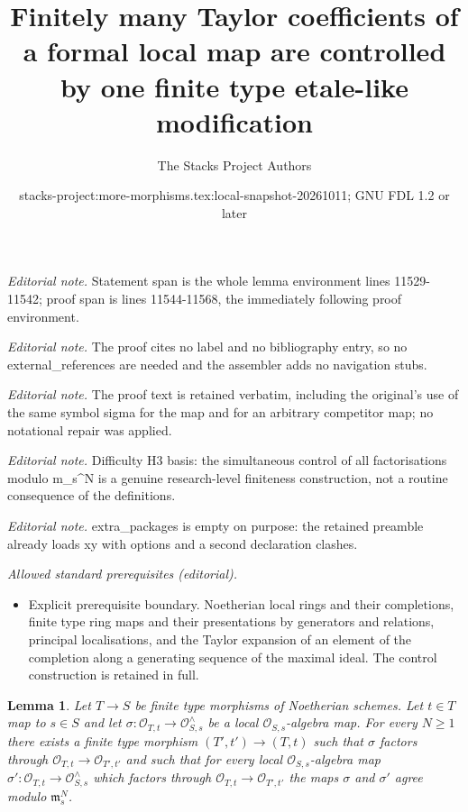 \documentclass[10pt,a4paper]{amsart}
\title{Finitely many Taylor coefficients of a formal local map are controlled by one finite type etale-like modification}
\author{The Stacks Project Authors}
\date{stacks-project:more-morphisms.tex:local-snapshot-20261011; GNU FDL 1.2 or later}
\theoremstyle{plain}
\newtheorem{lemma}[subsection]{Lemma}
\theoremstyle{definition}
\theoremstyle{remark}
\numberwithin{equation}{subsection}
\begin{document}
\maketitle
\noindent\textit{Editorial note.} Statement span is the whole lemma environment lines 11529-11542; proof span is lines 11544-11568, the immediately following proof environment.\par\medskip
\noindent\textit{Editorial note.} The proof cites no label and no bibliography entry, so no external\_references are needed and the assembler adds no navigation stubs.\par\medskip
\noindent\textit{Editorial note.} The proof text is retained verbatim, including the original's use of the same symbol sigma for the map and for an arbitrary competitor map; no notational repair was applied.\par\medskip
\noindent\textit{Editorial note.} Difficulty H3 basis: the simultaneous control of all factorisations modulo m\_s\textasciicircum{}N is a genuine research-level finiteness construction, not a routine consequence of the definitions.\par\medskip
\noindent\textit{Editorial note.} extra\_packages is empty on purpose: the retained preamble already loads xy with options and a second declaration clashes.\par\medskip
\noindent\textit{Allowed standard prerequisites (editorial).}\begin{itemize}
\item Explicit prerequisite boundary. Noetherian local rings and their completions, finite type ring maps and their presentations by generators and relations, principal localisations, and the Taylor expansion of an element of the completion along a generating sequence of the maximal ideal. The control construction is retained in full.
\end{itemize}\medskip
\begin{lemma}
\label{lemma-control-agreement}
Let $T \to S$ be finite type morphisms of Noetherian schemes.
Let $t \in T$ map to $s \in S$ and let
$\sigma : \mathcal{O}_{T, t} \to \mathcal{O}_{S, s}^\wedge$
be a local $\mathcal{O}_{S, s}$-algebra map. For every $N \geq 1$
there exists a finite type morphism $(T', t') \to (T, t)$
such that $\sigma$ factors through
$\mathcal{O}_{T, t} \to \mathcal{O}_{T', t'}$
and such that for every local $\mathcal{O}_{S, s}$-algebra map
$\sigma' : \mathcal{O}_{T, t} \to \mathcal{O}_{S, s}^\wedge$
which factors through $\mathcal{O}_{T, t} \to \mathcal{O}_{T', t'}$
the maps $\sigma$ and $\sigma'$ agree modulo $\mathfrak m_s^N$.
\end{lemma}
\end{document}
